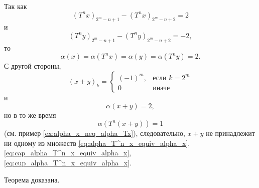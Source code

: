 Так как
\begin{equation}
	(T^n x)_{2^m-n+1} - (T^n x)_{2^m-n+2} = 2
\end{equation}
и
\begin{equation}
	(T^n y)_{2^m-n+1} - (T^n y)_{2^m-n+2} = -2
	,
\end{equation}
то
\begin{equation}
	\alpha(x) = \alpha(T^n x) = \alpha(y) = \alpha(T^n y) = 2
	.
\end{equation}
С другой стороны,
\begin{equation}
	(x+y)_k = \begin{cases}
		(-1)^m,  & \mbox{если } k = 2^m     \\
		0        & \mbox{иначе }
	\end{cases}
\end{equation}
и
\begin{equation}
	\alpha(x+y) = 2
	,
\end{equation}
но в то же время
\begin{equation}
	\alpha(T^n(x+y)) = 1
\end{equation}
(см. пример \ref{ex:alpha_x_neq_alpha_Tx}),
следовательно, $x+y$ не принадлежит ни одному из множеств
\eqref{eq:alpha_T^n_x_equiv_alpha_x}, \eqref{eq:cap_alpha_T^n_x_equiv_alpha_x}, \eqref{eq:cup_alpha_T^n_x_equiv_alpha_x}.

Теорема доказана.



